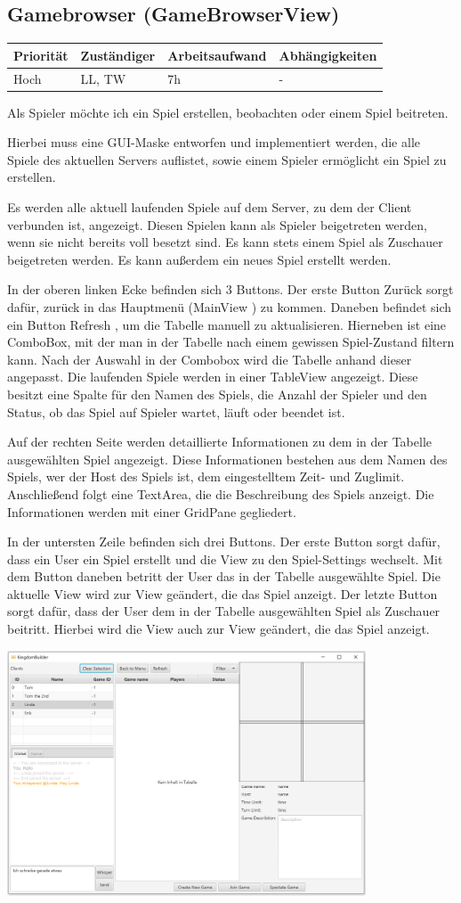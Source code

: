 \documentclass[a4paper]{scrreprt}
\newenvironment{requirement}[5] {
	\subsection{#1}
	\begin{tabularx}{\textwidth}{|X|l|X|X|}
		\hline
		Priorität & Zuständiger & Arbeitsaufwand & Abhängigkeiten \\
		\hline
		#2 & #3 & #4 & #5 \\
		\hline
	\end{tabularx}
	}{
	\newpage
	}
\begin{document}
\begin{requirement}{Gamebrowser (GameBrowserView)}{Hoch}{LL, TW}{7h}{-}

\begin{center}
	Als Spieler möchte ich ein Spiel erstellen, beobachten oder einem Spiel beitreten.
\end{center}

Hierbei muss eine GUI-Maske entworfen und implementiert werden, die alle Spiele des aktuellen Servers auflistet, sowie einem Spieler ermöglicht ein Spiel zu erstellen.

Es werden alle aktuell laufenden Spiele auf dem Server, zu dem der Client verbunden ist, angezeigt. Diesen Spielen kann als Spieler beigetreten werden, wenn sie nicht bereits voll besetzt sind. Es kann stets einem Spiel als Zuschauer beigetreten werden. Es kann außerdem ein neues Spiel erstellt werden.

In der oberen linken Ecke befinden sich 3 Buttons. Der erste Button \glqq Zurück \grqq{} sorgt dafür, zurück in das Hauptmenü (\glqq MainView \grqq{}) zu kommen.
Daneben befindet sich ein Button \glqq Refresh \grqq{}, um die Tabelle manuell zu aktualisieren.
Hierneben ist eine ComboBox, mit der man in der Tabelle nach einem gewissen Spiel-Zustand filtern kann. Nach der Auswahl in der Combobox wird die Tabelle anhand dieser angepasst.
Die laufenden Spiele werden in einer TableView angezeigt. Diese besitzt eine Spalte für den Namen des Spiels, die Anzahl der Spieler und den Status, ob das Spiel auf Spieler wartet, läuft oder beendet ist.

Auf der rechten Seite werden detaillierte Informationen zu dem in der Tabelle ausgewählten Spiel angezeigt. Diese Informationen bestehen aus dem Namen des Spiels, wer der Host des Spiels ist, dem eingestelltem Zeit- und Zuglimit. Anschließend folgt eine TextArea, die die Beschreibung des Spiels anzeigt.
Die Informationen werden mit einer GridPane gegliedert.

In der untersten Zeile befinden sich drei Buttons.
Der erste Button sorgt dafür, dass ein User ein Spiel erstellt und die View zu den Spiel-Settings wechselt.
Mit dem Button daneben betritt der User das in der Tabelle ausgewählte Spiel. Die aktuelle View wird zur View geändert, die das Spiel anzeigt.
Der letzte Button sorgt dafür, dass der User dem in der Tabelle ausgewählten Spiel als Zuschauer beitritt. Hierbei wird die View auch zur View geändert, die das Spiel anzeigt.

\includegraphics[width=0.8\textwidth]{view3.png}



\end{requirement}
\end{document}
